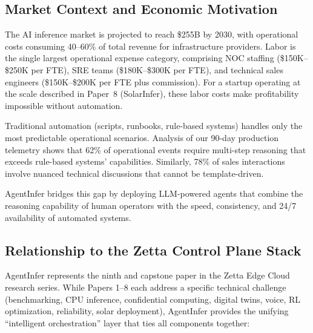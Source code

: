 \documentclass[conference,10pt,letterpaper]{IEEEtran}
\begin{document}
\subsection{Market Context and Economic Motivation}

The AI inference market is projected to reach \$255B by 2030, with operational costs consuming 40--60\% of total revenue for infrastructure providers. Labor is the single largest operational expense category, comprising NOC staffing (\$150K--\$250K per FTE), SRE teams (\$180K--\$300K per FTE), and technical sales engineers (\$150K--\$200K per FTE plus commission). For a startup operating at the scale described in Paper~8 (SolarInfer), these labor costs make profitability impossible without automation.

Traditional automation (scripts, runbooks, rule-based systems) handles only the most predictable operational scenarios. Analysis of our 90-day production telemetry shows that 62\% of operational events require multi-step reasoning that exceeds rule-based systems' capabilities. Similarly, 78\% of sales interactions involve nuanced technical discussions that cannot be template-driven.

AgentInfer bridges this gap by deploying LLM-powered agents that combine the reasoning capability of human operators with the speed, consistency, and 24/7 availability of automated systems.

\subsection{Relationship to the Zetta Control Plane Stack}

AgentInfer represents the ninth and capstone paper in the Zetta Edge Cloud research series. While Papers 1--8 each address a specific technical challenge (benchmarking, CPU inference, confidential computing, digital twins, voice, RL optimization, reliability, solar deployment), AgentInfer provides the unifying ``intelligent orchestration'' layer that ties all components together:
\end{document}
